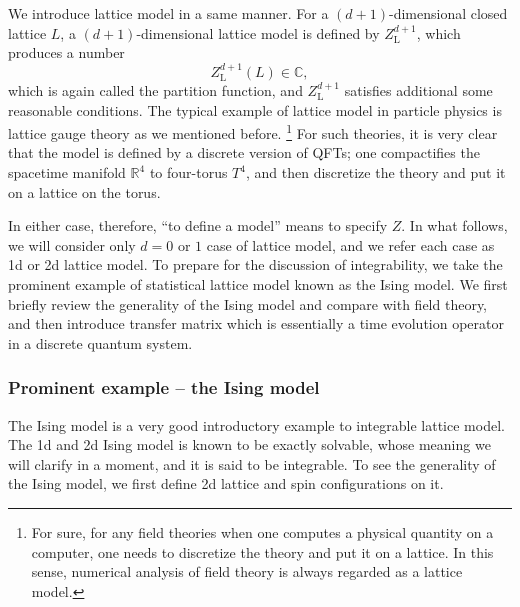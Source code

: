 We introduce lattice model in a same manner. For a $(d+1)$-dimensional
closed lattice $L$, a $(d+1)$-dimensional lattice model is defined
by $Z_{\mathrm{L}}^{d+1}$, which produces a number
\begin{equation}
  Z_{\mathrm{L}}^{d+1}(L)  \in  \mathbb{C},
\label{eq:lattice_Z}
\end{equation}
which is again called the partition function, and $Z_{\mathrm{L}}^{d+1}$
satisfies additional some reasonable conditions. The typical
example of lattice model in particle physics is lattice gauge theory
as we mentioned before.%
%
\footnote{For sure, for any field theories when one computes a physical quantity
on a computer, one needs to discretize the theory and put it on a
lattice. In this sense, numerical analysis of field theory is always
regarded as a lattice model. }
%
For such theories, it is very clear that the model is defined by
a discrete version of QFTs; one compactifies the spacetime manifold
$\mathbb{R}^{4}$ to four-torus $T^{4}$, and then discretize the
theory and put it on a lattice on the torus.

In either case, therefore, ``to define a model'' means to specify $Z$.
In what follows, we will consider only $d=0$ or $1$ case of
lattice model, and we refer each case as 1d or 2d lattice model. To
prepare for the discussion of integrability, we take the prominent
example of statistical lattice model known as the Ising model. We first
briefly review the generality of the Ising model and compare with
field theory, and then introduce transfer matrix which is essentially
a time evolution operator in a discrete quantum system.





\subsubsection{Prominent example -- the Ising model}

The Ising model is a very good introductory example to integrable lattice
model. The 1d and 2d Ising model is known to be exactly solvable,
whose meaning we will clarify in a moment, and it is said to be integrable.
To see the generality of the Ising model, we first define 2d lattice
and spin configurations on it.

